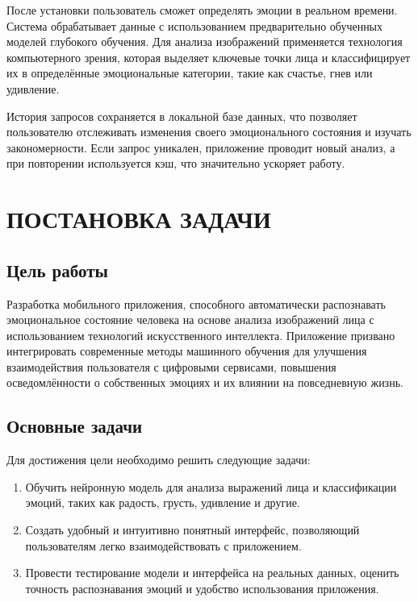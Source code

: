 {{        После установки пользователь сможет определять эмоции в реальном времени. Система обрабатывает данные с использованием предварительно обученных моделей глубокого обучения. Для анализа изображений применяется технология компьютерного зрения, которая выделяет ключевые точки лица и классифицирует их в определённые эмоциональные категории, такие как счастье, гнев или удивление.

        История запросов сохраняется в локальной базе данных, что позволяет пользователю отслеживать изменения своего эмоционального состояния и изучать закономерности. Если запрос уникален, приложение проводит новый анализ, а при повторении используется кэш, что значительно ускоряет работу.
    }
    \newpage

\newpage

\section{\MakeUppercase{Постановка задачи}}


\subsection*{Цель работы}
Разработка мобильного приложения, способного автоматически распознавать эмоциональное состояние человека на основе анализа изображений лица с использованием технологий искусственного интеллекта. Приложение призвано интегрировать современные методы машинного обучения для улучшения взаимодействия пользователя с цифровыми сервисами, повышения осведомлённости о собственных эмоциях и их влиянии на повседневную жизнь.

\subsection*{Основные задачи}
Для достижения цели необходимо решить следующие задачи:
\begin{enumerate}
    \item Обучить нейронную модель для анализа выражений лица и классификации эмоций, таких как радость, грусть, удивление и другие.
    \item Создать удобный и интуитивно понятный интерфейс, позволяющий пользователям легко взаимодействовать с приложением.
    \item Провести тестирование модели и интерфейса на реальных данных, оценить точность распознавания эмоций и удобство использования приложения.
\end{enumerate}

}
